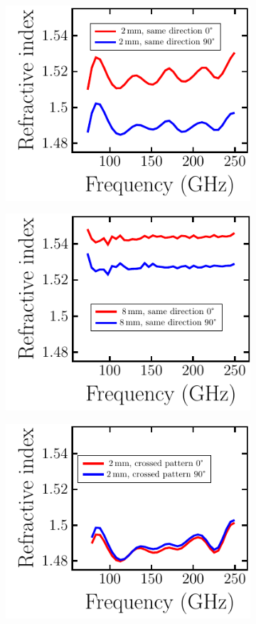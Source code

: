 \begin{figure}[H]
    \begin{subfigure}[b]{.33\linewidth}
    \caption{}\label{}
    \centering\includegraphics[scale=0.65]{images/results/plots/polymer/IntrinsicBF/ri_fullplates_b.pdf}
    \end{subfigure}%
    \begin{subfigure}[b]{.33\linewidth}
    \caption{}\label{}
    \centering\includegraphics[scale=0.65]{images/results/plots/polymer/IntrinsicBF/ri_fullplates_c.pdf}
    \end{subfigure}
    \begin{subfigure}[b]{.33\linewidth}
    \caption{}\label{}
    \centering\includegraphics[scale=0.65]{images/results/plots/polymer/IntrinsicBF/ri_fullplates_a.pdf}

\end{subfigure}
\end{figure}
